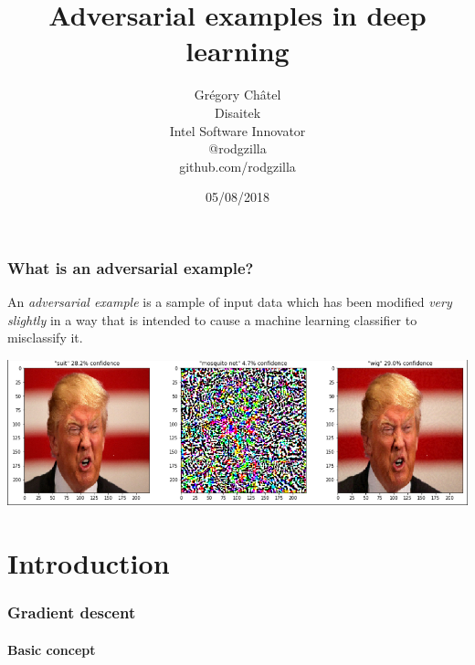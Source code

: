 \documentclass[9pt]{beamer}
\title{Adversarial examples in deep learning}
\author[G. Châtel]{Grégory Châtel\\\vspace{0.3cm}Disaitek\\Intel Software Innovator\\\vspace{0.3cm}@rodgzilla\\github.com/rodgzilla}
\date{05/08/2018}
\begin{document}

\begin{frame}

  \maketitle

\end{frame}

\begin{frame}
  \frametitle{What is an adversarial example?}

  An \emph{adversarial example} is a sample of input data which has
  been modified \emph{very slightly} in a way that is intended to
  cause a machine learning classifier to misclassify it.

  \bigskip

  \pause

  \begin{center}
    \includegraphics[trim={2pt 2pt 2pt 0}, clip, width =
      \linewidth]{images/adversarial_example_wig.png}
  \end{center}

\end{frame}

\section{Introduction}

\begin{frame}
  \frametitle{Gradient descent}

  \framesubtitle{Basic concept}

  \begin{center}
    \scalebox{0.8}{
      
    }
  \end{center}

\end{frame}
\end{document}
